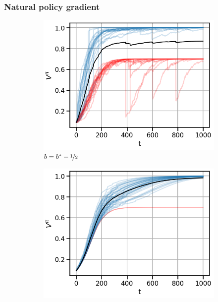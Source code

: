 \subsubsection*{Natural policy gradient}
\begin{figure}[!ht]
\centering
  \begin{subfigure}[b]{0.245\linewidth}
    \includegraphics[width=\textwidth]{articles/baselines/figs/appendix_figs_3arm_035/natural_minvar_-05_eta=0025.png}
    \caption{$b = b^\ast - \nicefrac{1}{2}$}
  \end{subfigure}
    \begin{subfigure}[b]{0.245\linewidth}
    \includegraphics[width=\textwidth]{articles/baselines/figs/appendix_figs_3arm_035/natural_minvar_0_eta=0025.png}

\end{subfigure}
\end{figure}
